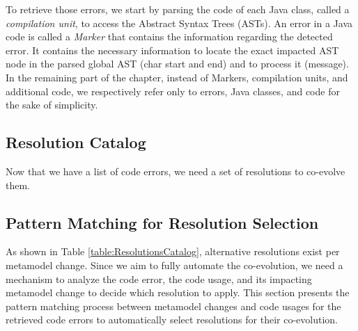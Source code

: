 To retrieve those errors, we start by parsing the code of each Java class, called a \emph{compilation unit}, to access the Abstract Syntax Trees (ASTs). An error in a Java code is called a \emph{Marker} that contains the information regarding the detected error. It contains the necessary information to locate the exact impacted AST node in the parsed global AST (\ie char start and end) and  to process it (\ie message).
In the remaining part of the chapter, instead of Markers, compilation units, and additional code, we respectively refer only to errors, Java classes, and code for the sake of simplicity.  

\subsection{Resolution Catalog}

Now that we have a list of code errors, we need a set of resolutions to co-evolve them.

\subsection{Pattern Matching for Resolution Selection}
\label{pattern_matching}




As shown in Table \ref{table:ResolutionsCatalog}, alternative resolutions exist per metamodel change. Since we aim to fully automate the co-evolution, we need a mechanism to analyze the code error, the code usage, and its impacting metamodel change to decide which resolution to apply. 
This section presents the pattern matching process between metamodel changes and code usages for the retrieved code errors to automatically select resolutions for their co-evolution.


